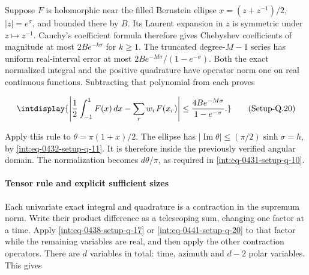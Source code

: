 
Suppose \(F\) is holomorphic near the filled Bernstein ellipse \(x=(z+z^{-1})/2\), \(|z|=e^\sigma\), and bounded there by \(B\). Its Laurent expansion in \(z\) is symmetric under \(z\mapsto z^{-1}\). Cauchy's coefficient formula therefore gives Chebyshev coefficients of magnitude at most \(2Be^{-k\sigma}\) for \(k\ge1\). The truncated degree-\(M-1\) series has uniform real-interval error at most \(2Be^{-M\sigma}/(1-e^{-\sigma})\). Both the exact normalized integral and the positive quadrature have operator norm one on real continuous functions. Subtracting that polynomial from each proves


\label{int:eq-setup-q-20}
\begingroup\renewcommand{\theHequation}{intdisplay.891}
\begin{equation}
\intdisplay{
\left|\frac12\int_{-1}^1 F(x)\,dx-\sum_rw_rF(x_r)\right|
\le\frac{4Be^{-M\sigma}}{1-e^{-\sigma}}.
}
\tag{Setup-Q.20}
\label{int:eq-0441-setup-q-20}
\end{equation}
\endgroup


Apply this rule to \(\theta=\pi(1+x)/2\). The ellipse has \(|\operatorname{Im}\theta|\le(\pi/2)\sinh\sigma=h\), by \hyperref[int:eq-setup-q-11]{\eqref{int:eq-0432-setup-q-11}}. It is therefore inside the previously verified angular domain. The normalization becomes \(d\theta/\pi\), as required in \hyperref[int:eq-setup-q-10]{\eqref{int:eq-0431-setup-q-10}}.


\paragraph{Tensor rule and explicit sufficient sizes}

\mbox{}\par\smallskip


Each univariate exact integral and quadrature is a contraction in the supremum norm. Write their product difference as a telescoping sum, changing one factor at a time. Apply \hyperref[int:eq-setup-q-17]{\eqref{int:eq-0438-setup-q-17}} or \hyperref[int:eq-setup-q-20]{\eqref{int:eq-0441-setup-q-20}} to that factor while the remaining variables are real, and then apply the other contraction operators. There are \(d\) variables in total: time, azimuth and \(d-2\) polar variables. This gives


